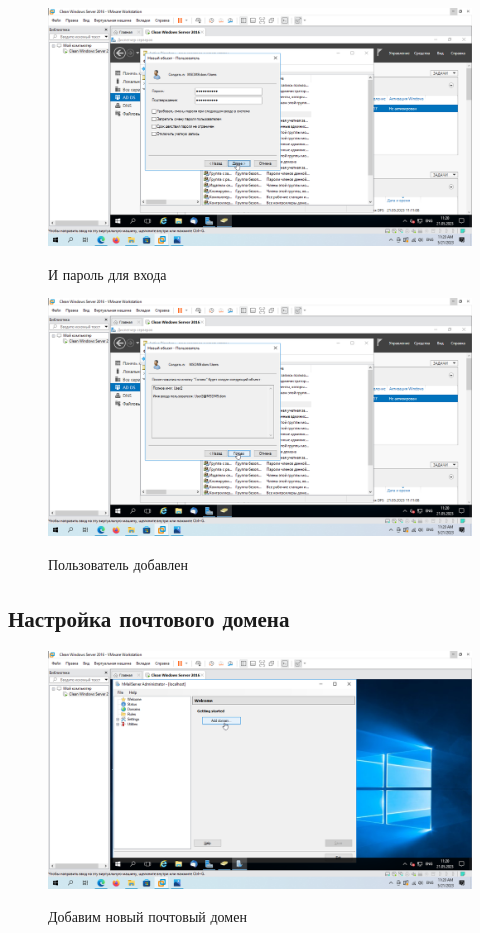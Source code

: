 \documentclass[a4paper]{article}
\begin{document}
  \begin{figure}[H]
    \centering
    \includegraphics[width=\textwidth]{11_0102}
    \label{img:102}
    \caption{И пароль для входа}
  \end{figure}

  \begin{figure}[H]
    \centering
    \includegraphics[width=\textwidth]{11_0103}
    \label{img:103}
    \caption{Пользователь добавлен}
  \end{figure}

  \subsection{Настройка почтового домена}

  \begin{figure}[H]
    \centering
    \includegraphics[width=\textwidth]{11_0104}
    \label{img:104}
    \caption{Добавим новый почтовый домен}
  \end{figure}
\end{document}
